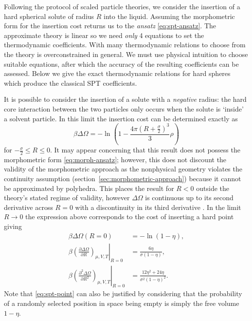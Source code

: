 \documentclass[11pt,twoside]{report}
\begin{document}
Following the protocol of scaled particle theories, we consider the insertion of a hard spherical solute of radius $R$ into the liquid.
Assuming the morphometric form for the insertion cost returns us to the \emph{ansatz} \eqref{eq:spt-ansatz}.
The approximate theory is linear so we need \emph{only} 4 equations to set the thermodynamic coefficients.
With many thermodynamic relations to choose from the theory is overconstrained in general.
We must use physical intuition to choose suitable equations, after which the accuracy of the resulting coefficients can be assessed.
Below we give the exact thermodynamic relations for hard spheres which produce the classical SPT coefficients.

It is possible to consider the insertion of a solute with a \emph{negative} radius: the hard core interaction between the two particles only occurs when the solute is `inside' a solvent particle.
In this limit the insertion cost can be determined exactly as \cite{ReissJCP1959}
\begin{equation}
  \beta \Delta \Omega =
  -\ln{\left(
    1 - \frac{4\pi \left(R + \frac{\sigma}{2}\right)^3}{3} \rho
    \right)}
\end{equation}
for $-\frac{\sigma}{2} \le R \le 0$.
It may appear concerning that this result does not possess the morphometric form \eqref{eq:morph-ansatz}; however, this does not discount the validity of the morphometric approach as the nonphysical geometry violates the continuity assumption (section~\ref{sec:morphometric-approach}) because it cannot be approximated by polyhedra.
This places the result for $R < 0$ outside the theory's stated regime of validity, however $\Delta\Omega$ is continuous up to its second derivative across $R=0$ with a discontinuity in its third derivative \cite{ReissJCP1959}.
In the limit $R \to 0$ the expression above corresponds to the cost of inserting a hard point giving
\begin{subequations}\label{eq:spt-origin-continuity}
  \begin{align}
    \label{eq:spt-point}
    \beta \Delta\Omega(R=0)
    &=
    -\ln{(1- \eta)},
    \\
    \label{eq:spt-point-d1}
    \beta \left. \left(
    \frac{\partial \Delta\Omega}{\partial R}
    \right)_{\mu, V, T} \right|_{R=0}
    &=
    \frac{6\eta}{\sigma (1- \eta)},
    \\
    \label{eq:spt-point-d2}
    \beta \left. \left(
    \frac{\partial^2 \Delta\Omega}{\partial R^2}
    \right)_{\mu, V, T} \right|_{R=0}
    &=
    \frac{12\eta^2 + 24\eta}{\sigma^2 (1- \eta)^2}.
 \end{align}
\end{subequations}
Note that \eqref{eq:spt-point} can also be justified by considering that the probability of a randomly selected position in space being empty is simply the free volume $1-\eta$.
\end{document}
